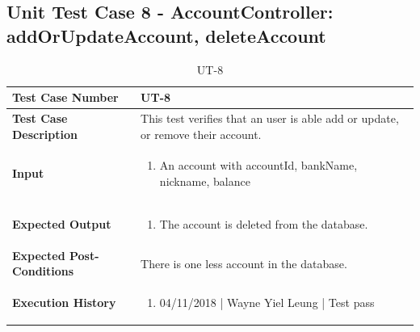 \documentclass[12pt]{article}
\begin{document}
\subsection{Unit Test Case 8 - AccountController: addOrUpdateAccount, deleteAccount}
\def\arraystretch{1.5}%
\begin{table}[htbp]
\centering
\caption{UT-8}
\label{UT-8}
\begin{tabularx}{\textwidth}{ | l | X |}
\hline
\textbf{Test Case Number}      		&  UT-8                   			\\ \hline
\textbf{Test Case Description}    	&  This test verifies that an user is able add or update, or remove their account.                 				\\ \hline
\textbf{Input}         			& 
\begin{enumerate}
\item An account with accountId, bankName, nickname, balance
\end{enumerate} 		\\ \hline
\textbf{Expected Output}     		&
\begin{enumerate}
\item The account is deleted from the database.
\end{enumerate} 		\\ \hline
\textbf{Expected Post-Conditions}	&   There is one less account in the database.                 				\\ \hline
\textbf{Execution History}   		&  	\begin{enumerate}
								\item 04/11/2018 | Wayne Yiel Leung | Test pass
							\end {enumerate} \\ \hline
\end{tabularx}
\end{table}
\clearpage


\end{document}
